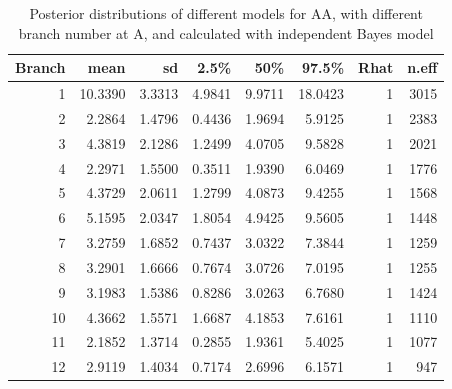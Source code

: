 \begin{table}[!t]
	\centering
	\begin{tabular}{rrrrrrrr}
		\hline
		Branch & mean & sd & 2.5\% & 50\% & 97.5\% & Rhat & n.eff \\ 
		\hline
		1 & 10.3390 & 3.3313 & 4.9841 & 9.9711 & 18.0423 & 1 & 3015 \\ 
		2 & 2.2864 & 1.4796 & 0.4436 & 1.9694 & 5.9125 & 1 & 2383 \\ 
		3 & 4.3819 & 2.1286 & 1.2499 & 4.0705 & 9.5828 & 1 & 2021 \\ 
		4 & 2.2971 & 1.5500 & 0.3511 & 1.9390 & 6.0469 & 1 & 1776 \\ 
		5 & 4.3729 & 2.0611 & 1.2799 & 4.0873 & 9.4255 & 1 & 1568 \\ 
		6 & 5.1595 & 2.0347 & 1.8054 & 4.9425 & 9.5605 & 1 & 1448 \\ 
		7 & 3.2759 & 1.6852 & 0.7437 & 3.0322 & 7.3844 & 1 & 1259 \\ 
		8 & 3.2901 & 1.6666 & 0.7674 & 3.0726 & 7.0195 & 1 & 1255 \\ 
		9 & 3.1983 & 1.5386 & 0.8286 & 3.0263 & 6.7680 & 1 & 1424 \\ 
		10 & 4.3662 & 1.5571 & 1.6687 & 4.1853 & 7.6161 & 1 & 1110 \\ 
		11 & 2.1852 & 1.3714 & 0.2855 & 1.9361 & 5.4025 & 1 & 1077 \\ 
		12 & 2.9119 & 1.4034 & 0.7174 & 2.6996 & 6.1571 & 1 & 947 \\ 
		\hline
	\end{tabular}
	\caption{Posterior distributions of different models for AA, with different branch number at A, and calculated with independent Bayes model} 
	\label{tab:pstproAA}
\end{table}

